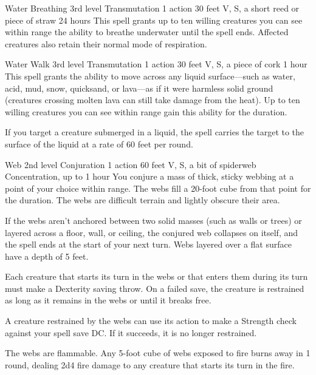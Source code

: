 \documentclass[10pt,a4paper,twoside,bg=print,twocolumn,openany,nodeprecatedcode]{dndbook}
\begin{document}
\DndSpellHeader%
{Water Breathing}
{3rd level Transmutation}
{1 action}
{30 feet}
{V, S, a short reed or piece of straw}
{24 hours}
This spell grants up to ten willing creatures you can see within range the ability to breathe underwater until the spell ends. Affected creatures also retain their normal mode of respiration.



\DndSpellHeader%
{Water Walk}
{3rd level Transmutation}
{1 action}
{30 feet}
{V, S, a piece of cork}
{1 hour}
This spell grants the ability to move across any liquid surface—such as water, acid, mud, snow, quicksand, or lava—as if it were harmless solid ground (creatures crossing molten lava can still take damage from the heat). Up to ten willing creatures you can see within range gain this ability for the duration.

If you target a creature submerged in a liquid, the spell carries the target to the surface of the liquid at a rate of 60 feet per round.



\DndSpellHeader%
{Web}
{2nd level Conjuration}
{1 action}
{60 feet}
{V, S, a bit of spiderweb}
{Concentration, up to 1 hour}
You conjure a mass of thick, sticky webbing at a point of your choice within range. The webs fill a 20-foot cube from that point for the duration. The webs are difficult terrain and lightly obscure their area.

If the webs aren't anchored between two solid masses (such as walls or trees) or layered across a floor, wall, or ceiling, the conjured web collapses on itself, and the spell ends at the start of your next turn. Webs layered over a flat surface have a depth of 5 feet.

Each creature that starts its turn in the webs or that enters them during its turn must make a Dexterity saving throw. On a failed save, the creature is restrained as long as it remains in the webs or until it breaks free.

A creature restrained by the webs can use its action to make a Strength check against your spell save DC. If it succeeds, it is no longer restrained.

The webs are flammable. Any 5-foot cube of webs exposed to fire burns away in 1 round, dealing 2d4 fire damage to any creature that starts its turn in the fire.
\end{document}

